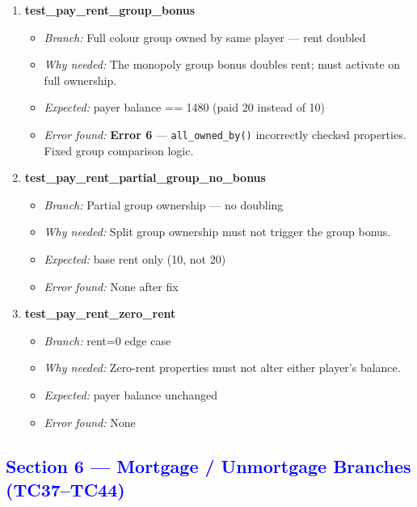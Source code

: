 \documentclass{article}
\begin{document}
\begin{enumerate}[resume, label=\textbf{TC\arabic*.}]
  \item \textbf{test\_pay\_rent\_group\_bonus}
  \begin{itemize}[noitemsep]
    \item \textit{Branch:} Full colour group owned by same player — rent doubled
    \item \textit{Why needed:} The monopoly group bonus doubles rent; must activate on full ownership.
    \item \textit{Expected:} payer balance == 1480 (paid 20 instead of 10)
    \item \textit{Error found:} \textbf{Error 6} — \texttt{all\_owned\_by()} incorrectly checked properties. Fixed group comparison logic.
  \end{itemize}

  \item \textbf{test\_pay\_rent\_partial\_group\_no\_bonus}
  \begin{itemize}[noitemsep]
    \item \textit{Branch:} Partial group ownership — no doubling
    \item \textit{Why needed:} Split group ownership must not trigger the group bonus.
    \item \textit{Expected:} base rent only (10, not 20)
    \item \textit{Error found:} None after fix
  \end{itemize}

  \item \textbf{test\_pay\_rent\_zero\_rent}
  \begin{itemize}[noitemsep]
    \item \textit{Branch:} rent=0 edge case
    \item \textit{Why needed:} Zero-rent properties must not alter either player's balance.
    \item \textit{Expected:} payer balance unchanged
    \item \textit{Error found:} None
  \end{itemize}

\end{enumerate}

\subsection*{\textcolor{blue}{Section 6 — Mortgage / Unmortgage Branches (TC37--TC44)}}
\end{document}
